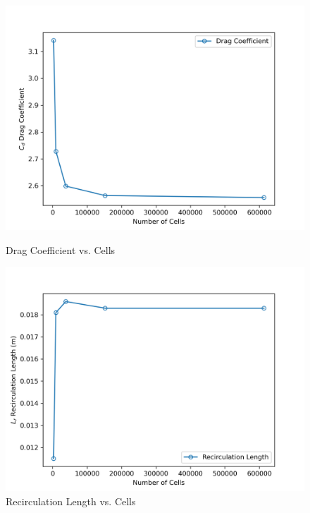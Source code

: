\begin{figure}[H]
    \centering
    \begin{minipage}{0.45\textwidth}
        \centering
        \includegraphics[width=\textwidth]{Questions/Figures/drag_coefficient_vs_cells.png}
        \caption{Drag Coefficient vs. Cells}
        \label{fig:drag_coefficient_vs_cells}
    \end{minipage}
    \begin{minipage}{0.45\textwidth}
        \centering
        \includegraphics[width=\textwidth]{Questions/Figures/recirc_length_vs_cells.png}
        \caption{Recirculation Length vs. Cells}
        \label{fig:recirculation_length_vs_cells}
    \end{minipage}
\end{figure}
